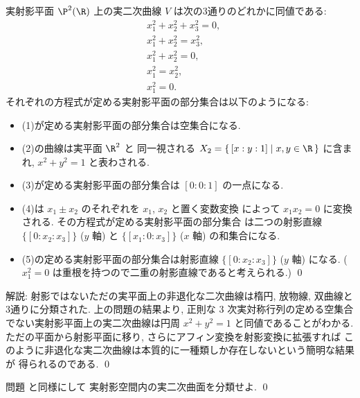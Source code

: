 \documentclass[12pt,twoside]{jarticle}
\begin{document}
\begin{question}[実射影平面上の実二次曲線の分類]
\label{q:proj-real-quadratic}
  実射影平面 $\P^2(\R)$ 上の実二次曲線 $V$ は次の3通りのどれかに同値である:
  \begin{align*}
    &
    x_1^2 + x_2^2 + x_3^2 = 0,
    \tag{1}
    \\ &
    x_1^2 + x_2^2 = x_3^2,
    \tag{2}
    \\ &
    x_1^2 + x_2^2 = 0,
    \tag{3}
    \\ &
    x_1^2 = x_2^2,
    \tag{4}
    \\ &
    x_1^2 = 0.
    \tag{5}
  \end{align*}
  それぞれの方程式が定める実射影平面の部分集合は以下のようになる:
  \begin{itemize}
  \item (1)が定める実射影平面の部分集合は空集合になる.
  \item (2)の曲線は実平面 $\R^2$ と
    同一視される $X_2=\{\,[x:y:1]\mid x,y\in\R\,\}$ に含まれ, 
    $x^2+y^2=1$ と表わされる.
  \item (3)が定める実射影平面の部分集合は $[0:0:1]$ の一点になる.
  \item (4)は $x_1\pm x_2$ のそれぞれを $x_1$, $x_2$ と置く変数変換
    によって $x_1x_2=0$ に変換される. その方程式が定める実射影平面の部分集合
    は二つの射影直線 $\{[0:x_2:x_3]\}$ ($y$ 軸) と $\{[x_1:0:x_3]\}$ ($x$ 軸) 
    の和集合になる.
  \item (5)の定める実射影平面の部分集合は射影直線 $\{[0:x_2:x_3]\}$ ($y$ 軸) 
    になる. ($x_1^2=0$ は重根を持つので二重の射影直線であると考えられる.)
    \qed
  \end{itemize}
\end{question}

\noindent
解説: 射影ではないただの実平面上の非退化な二次曲線は楕円, 放物線, 双曲線と
3通りに分類された. 上の問題の結果より, 正則な $3$ 次実対称行列の定める空集合
でない実射影平面上の実二次曲線は円周 $x^2+y^2=1$ と同値であることがわかる.
ただの平面から射影平面に移り, さらにアフィン変換を射影変換に拡張すれば
このように非退化な実二次曲線は本質的に一種類しか存在しないという簡明な結果が
得られるのである.
\qed


\begin{question}[実射影空間内の実二次曲面の分類]
  問題  と同様にして
  実射影空間内の実二次曲面を分類せよ. 
  \qed
\end{question}
\end{document}
